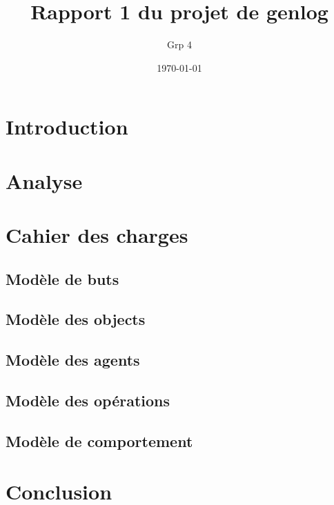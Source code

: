 \documentclass[12pt,openany]{book}
\title{Rapport 1 du projet de genlog}
\author{Grp 4}
\date{\today}
\begin{document}
\setlength{\parskip}{1em}

\maketitle
\tableofcontents

\chapter*{Introduction}
	

\chapter{Analyse}
	

\chapter{Cahier des charges}
	\section{Modèle de buts}
		

	\section{Modèle des objects}
		

	\section{Modèle des agents}
		

	\section{Modèle des opérations}
		

	\section{Modèle de comportement}
		

\chapter*{Conclusion}
	
\end{document}
